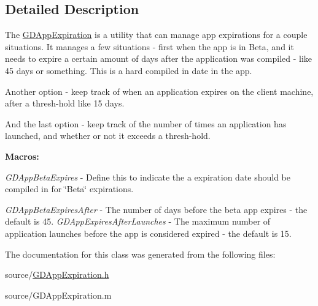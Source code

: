 \subsection{Detailed Description}
The \hyperlink{interface_g_d_app_expiration}{GDAppExpiration} is a utility that can manage app expirations for a couple situations. It manages a few situations -\/ first when the app is in Beta, and it needs to expire a certain amount of days after the application was compiled -\/ like 45 days or something. This is a hard compiled in date in the app.

Another option -\/ keep track of when an application expires on the client machine, after a thresh-\/hold like 15 days.

And the last option -\/ keep track of the number of times an application has launched, and whether or not it exceeds a thresh-\/hold.

{\bfseries Macros:}\par
 {\itshape GDAppBetaExpires\/} -\/ Define this to indicate the a expiration date should be compiled in for \char`\"{}Beta\char`\"{} expirations.\par
 {\itshape GDAppBetaExpiresAfter\/} -\/ The number of days before the beta app expires -\/ the default is 45. {\itshape GDAppExpiresAfterLaunches\/} -\/ The maximum number of application launches before the app is considered expired -\/ the default is 15. 

The documentation for this class was generated from the following files:\begin{DoxyCompactItemize}
\item 
source/\hyperlink{_g_d_app_expiration_8h}{GDAppExpiration.h}\item 
source/GDAppExpiration.m\end{DoxyCompactItemize}
